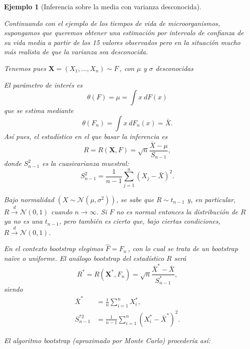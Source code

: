 \documentclass[
]{book}
\renewcommand{\mathbf}[1]{\symbf{#1}}
\theoremstyle{break}
\newtheorem{example}{Ejemplo}[chapter]
\theoremstyle{nonumberplain}
\begin{document}
\begin{example}[Inferencia sobre la media con varianza desconocida]
\protect\hypertarget{exm:media-dt-desconocida}{}\label{exm:media-dt-desconocida}

\vspace{0.5cm}

Continuando con el ejemplo de los tiempos de vida de microorganismos,
supongamos que queremos obtener una estimación por intervalo de confianza
de su vida media a partir de los 15 valores observados pero en la
situación mucho más realista de que la varianza sea desconocida.

Tenemos pues
\(\mathbf{X}=\left( X_1,\ldots ,X_n \right) \sim F\,\), con
\(\mu\) y \(\sigma\) desconocidas

El parámetro de interés es
\[\theta \left( F \right) =\mu =\int x~dF\left( x \right)\]
que se estima mediante
\[\theta \left( F_n \right) =\int x~dF_n\left( x \right) =\bar{X}.\]
Así pues, el estadístico en el que basar la inferencia es
\[R=R\left( \mathbf{X},F \right) =\sqrt{n}\frac{\bar{X}-\mu }{S_{n-1}},\]
donde \(S_{n-1}^2\) es la cuasivarianza muestral:
\[S_{n-1}^2=\frac{1}{n-1}\sum_{j=1}^{n}\left( X_j-\bar{X} \right)^2.\]

Bajo normalidad \(\left( X\sim \mathcal{N}\left( \mu ,\sigma^2 \right) \right)\),
se sabe que \(R\sim t_{n-1}\) y, en particular,
\(R\overset{d}{\rightarrow } \mathcal{N}\left( 0,1 \right)\) cuando \(n\rightarrow \infty\).
Si \(F\) no es normal entonces la distribución de \(R\) ya no es una \(t_{n-1}\),
pero también es cierto que, bajo ciertas condiciones,
\(R\overset{d}{\rightarrow}\mathcal{N}\left(0,1 \right)\).

En el contexto bootstrap elegimos \(\hat{F}=F_n\,\), con lo cual se
trata de un bootstrap naïve o uniforme. El análogo bootstrap del
estadístico \(R\) será
\[R^{\ast}=R\left( \mathbf{X}^{\ast},F_n \right) =\sqrt{n}\frac{
\bar{X}^{\ast}-\bar{X}}{S_{n-1}^{\ast}},\]
siendo
\[\begin{aligned}
\bar{X}^{\ast} &= \frac{1}{n}\sum_{i=1}^{n}X_i^{\ast}, \\
S_{n-1}^{\ast 2} &= \frac{1}{n-1}\sum_{i=1}^{n}\left( X_i^{\ast}-
\bar{X}^{\ast} \right)^2.
\end{aligned}\]

El algoritmo bootstrap (aproximado por Monte Carlo) procedería así:


\end{example}
\end{document}
